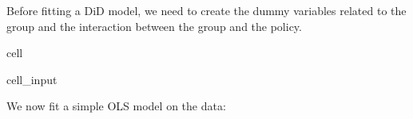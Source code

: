 \documentclass[letterpaper,10pt,english]{jupyterBook}
\begin{document}
\sphinxAtStartPar
Before fitting a DiD model, we need to create the dummy variables related to the group and the interaction between the group and the policy.

\begin{sphinxuseclass}{cell}\begin{sphinxVerbatimInput}

\begin{sphinxuseclass}{cell_input}
\begin{sphinxVerbatim}[commandchars=\\\{\}]
\PYG{p}{[}\PYG{p}{]}  \PYG{p}{[}\PYG{p}{]}    

\PYG{p}{[}\PYG{p}{]}  \PYG{p}{[}\PYG{p}{]}  \PYG{p}{[}\PYG{p}{]}
\end{sphinxVerbatim}

\end{sphinxuseclass}\end{sphinxVerbatimInput}

\end{sphinxuseclass}
\sphinxAtStartPar
We now fit a simple OLS model on the data:
\end{document}
